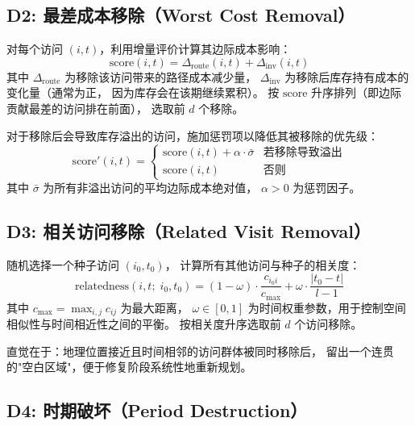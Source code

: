 \documentclass{article}
\begin{document}
\subsection{D2: 最差成本移除（Worst Cost Removal）}

对每个访问 $(i,t)$，利用增量评价计算其边际成本影响：
\begin{equation}
  \text{score}(i,t) = \Delta_{\text{route}}(i,t) + \Delta_{\text{inv}}(i,t)
  \label{eq:worst-cost-score}
\end{equation}
其中 $\Delta_{\text{route}}$ 为移除该访问带来的路径成本减少量，
$\Delta_{\text{inv}}$ 为移除后库存持有成本的变化量（通常为正，
因为库存会在该期继续累积）。
按 $\text{score}$ 升序排列（即边际贡献最差的访问排在前面），
选取前 $d$ 个移除。

对于移除后会导致库存溢出的访问，施加惩罚项以降低其被移除的优先级：
\begin{equation}
  \text{score}'(i,t) = \begin{cases}
    \text{score}(i,t) + \alpha \cdot \bar{\sigma}
      & \text{若移除导致溢出} \\
    \text{score}(i,t) & \text{否则}
  \end{cases}
  \label{eq:worst-cost-penalty}
\end{equation}
其中 $\bar{\sigma}$ 为所有非溢出访问的平均边际成本绝对值，
$\alpha > 0$ 为惩罚因子。

\subsection{D3: 相关访问移除（Related Visit Removal）}

随机选择一个种子访问 $(i_0, t_0)$，
计算所有其他访问与种子的相关度：
\begin{equation}
  \text{relatedness}(i,t;\; i_0, t_0)
    = (1-\omega) \cdot \frac{c_{i_0 i}}{c_{\max}}
      + \omega \cdot \frac{|t_0 - t|}{l - 1}
  \label{eq:relatedness}
\end{equation}
其中 $c_{\max} = \max_{i,j} c_{ij}$ 为最大距离，
$\omega \in [0,1]$ 为时间权重参数，用于控制空间相似性与时间相近性之间的平衡。
按相关度升序选取前 $d$ 个访问移除。

直觉在于：地理位置接近且时间相邻的访问群体被同时移除后，
留出一个连贯的"空白区域"，便于修复阶段系统性地重新规划。

\subsection{D4: 时期破坏（Period Destruction）}
\end{document}
